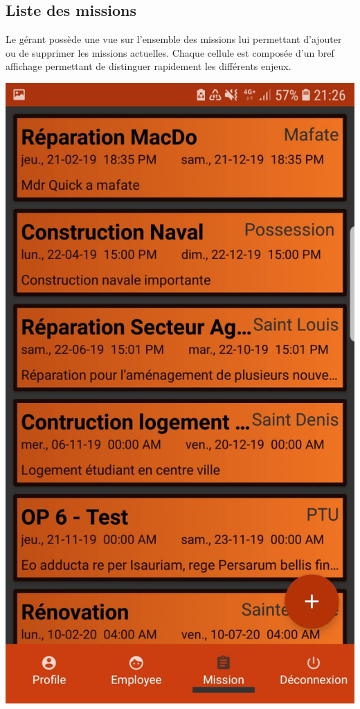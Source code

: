 \documentclass{article}
\begin{document}
\newpage

\subsection{Liste des missions}

Le gérant possède une vue sur l’ensemble des missions lui permettant d’ajouter ou de supprimer les missions actuelles. Chaque cellule est composée d’un bref affichage permettant de distinguer rapidement les différents enjeux.

\begin{center}
    \includegraphics[scale=0.1]{listeM.jpg}

\end{center}
\end{document}
